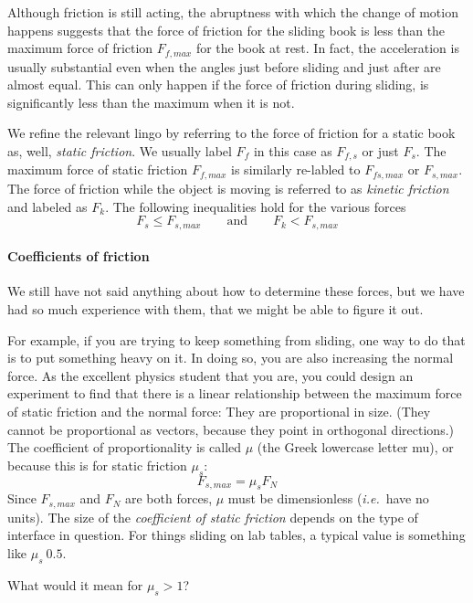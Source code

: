 Although friction is still acting, the abruptness with which the change of motion happens suggests that the force of friction for the sliding book is less than the maximum force of friction $F_{f, max}$ for the book at rest. In fact, the acceleration is usually substantial even when the angles just before sliding and just after are almost equal. This can only happen if the force of friction during sliding, is significantly less than the maximum when it is not. 

We refine the relevant lingo by referring to the force of friction for a static book as, well, {\em static friction}. We usually label $F_f$ in this case as $F_{f,s}$ or just $F_s$. The maximum force of static friction $F_{f,max}$ is similarly re-labled to $F_{fs,max}$ or $F_{s,max}$. The force of friction while the object is moving is referred to as {\em kinetic friction} and labeled as $F_k$. The following inequalities hold for the various forces
$$
F_s ≤ F_{s,max}
\quad \quad \textrm{and} \quad \quad 
F_k < F_{s,max}
$$

\paragraph{Coefficients of friction}
We still have not said anything about how to determine these forces, but we have had so much experience with them, that we might be able to figure it out. 

For example, if you are trying to keep something from sliding, one way to do that is to put something heavy on it. In doing so, you are also increasing the normal force. As the excellent physics student that you are, you could design an experiment to find that there is a linear relationship between the maximum force of static friction and the normal force: They are proportional in size. (They cannot be proportional as vectors, because they point in orthogonal directions.) The coefficient of proportionality is called $μ$ (the Greek lowercase letter mu), or because this is for static friction $μ_s$:
$$
F_{s,max} = μ_s F_N
$$
Since $F_{s,max}$ and $F_N$ are both forces, $μ$ must be dimensionless ({\it i.e.}\ have no units). The size of the {\em coefficient of static friction} depends on the type of interface in question. For things sliding on lab tables, a typical value is something like $μ_s ~ 0.5$. 
\begin{exercise}
What would it mean for $μ_s >1$?
\end{exercise}

